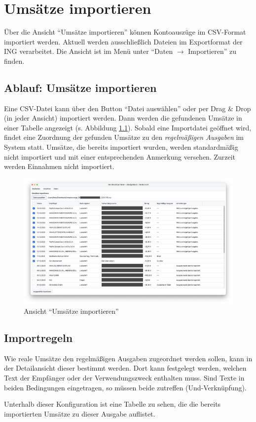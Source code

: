 \chapter{Umsätze importieren}

Über die Ansicht "`Umsätze importieren"' können Kontoauszüge im CSV-Format importiert werden. Aktuell werden ausschließlich Dateien im Exportformat der ING verarbeitet. Die Ansicht ist im Menü unter "`Daten $\rightarrow$ Importieren"' zu finden.

\section{Ablauf: Umsätze importieren}

Eine CSV-Datei kann über den Button "`Datei auswählen"' oder per Drag & Drop (in jeder Ansicht) importiert werden. Dann werden die gefundenen Umsätze in einer Tabelle angezeigt (s. Abbildung \ref{fig:ImportView}). Sobald eine Importdatei geöffnet wird, findet eine Zuordnung der gefunden Umsätze zu den \textit{regelmäßigen Ausgaben} im System statt. Umsätze, die bereits importiert wurden, werden standardmäßig nicht importiert und mit einer entsprechenden Anmerkung versehen. Zurzeit werden Einnahmen nicht importiert.

\begin{figure}[h!]
	\centering
	\includegraphics[width=\textwidth]{img/Screenshot-ImportView}
	\vspace{-2em}
	\caption{Ansicht "`Umsätze importieren"'}
	\label{fig:ImportView}
\end{figure}

\section{Importregeln}

Wie reale Umsätze den regelmäßigen Ausgaben zugeordnet werden sollen, kann in der Detailansicht dieser bestimmt werden. Dort kann festgelegt werden, welchen Text der Empfänger oder der Verwendungszweck enthalten muss. Sind Texte in beiden Bedingungen eingetragen, so müssen beide zutreffen (Und-Verknüpfung). 

Unterhalb dieser Konfiguration ist eine Tabelle zu sehen, die die bereits importierten Umsätze zu dieser Ausgabe auflistet. 